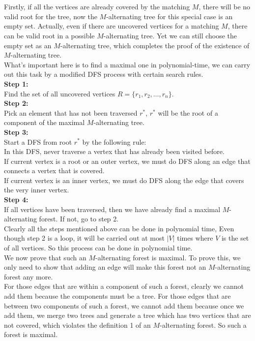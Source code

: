 \documentclass[12pt,letterpaper]{article}
\begin{document}
\section{}
Firstly, if all the vertices are already covered by the matching $M$,
there will be no valid root for the tree,
now the $M$-alternating tree for this special case is an empty set.
Actually, even if there are uncovered vertices for a matching $M$,
there can be valid root in a possible $M$-alternating tree.
Yet we can still choose the empty set as an $M$-alternating tree,
which completes the proof of the existence of $M$-alternating tree.\\
What's important here is to find a maximal one in polynomial-time,
we can carry out this task by a modified DFS process with certain search rules.\\
\textbf{Step 1:}\\
Find the set of all uncovered vertices $R=\{r_1,r_2,\dots,r_n\}$.\\
\textbf{Step 2:}\\
Pick an element that has not been traversed $r^*$,
$r^*$ will be the root of a component of the maximal $M$-alternating tree.\\
\textbf{Step 3:}\\
Start a DFS from root $r^*$ by the following rule:\\
In this DFS, never traverse a vertex that has already been visited before.\\
If current vertex is a root or an outer vertex,
we must do DFS along an edge that connects a vertex that is covered.\\
If current vertex is an inner vertex,
we must do DFS along the edge that covers the very inner vertex.\\
\textbf{Step 4:}\\
If all vertices have been traversed, 
then we have already find a maximal $M$-alternating forest.
If not, go to step 2.\\
Clearly all the steps mentioned above can be done in polynomial time,
Even though step 2 is a loop,
it will be carried out at most $|V|$ times where $V$ is the set of all vertices.
So this process can be done in polynomial time.\\
We now prove that such an $M$-alternating forest is maximal. 
To prove this, 
we only need to show that adding an edge will make this forest not an 
$M$-alternating forest any more.\\
For those edges that are within a component of such a forest,
clearly we cannot add them because the components must be a tree.
For those edges that are between two components of such a forest,
we cannot add them because once we add them, 
we merge two trees and generate a tree which has two vertices that are not covered,
which violates the definition 1 of an $M$-alternating forest.
So such a forest is maximal.
\end{document}

